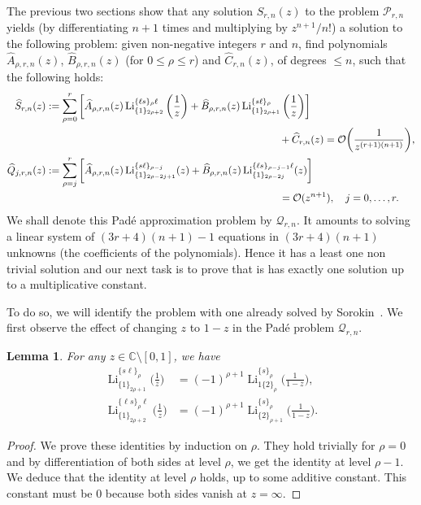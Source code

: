 \documentclass[reqno,12pt]{amsart}
\numberwithin{equation}{section}
\newtheorem{lem}{Lemma}
\theoremstyle{remark}
\def\li{\operatorname{Li}}
\begin{document}
The previous two sections show that any solution $S_{r,n}(z)$  to the problem $\mathcal{P}_{r,n}$ 
yields (by differentiating $n+1$ times and multiplying by $z^{n+1}/n!$) a solution to the following problem: given   
non-negative integers $r$ and $n$,  find polynomials $\widehat{A}_{\rho,r,n}(z)$, 
$ \widehat{B}_{\rho,r,n}(z)$ (for $0 \leq \rho \leq r$) and $ \widehat{C}_{r,n}(z) $, 
of degrees $\leq n$, such that the following holds:
\begin{align}
\widehat{S}_{r,n}(z)&
:= \sum_{\rho=0}^r \bigg[\widehat{A}_{\rho,r,n}(z) \li_{\{1\}_{2\rho+2}}^{\{\ell s\}_\rho \ell}\bigg(\frac1z\bigg) 
 +\widehat{B}_{\rho,r,n}(z) \li_{\{1\}_{2\rho+1}}^{\{s\ell\}_\rho}\bigg(\frac1z\bigg)  \bigg]  \notag
\\
&\hspace{8cm} + \widehat{C}_{r,n}(z) = \mathcal{O}\bigg(\frac{1}{z^{(r+1)(n+1)}}\bigg),  \notag
\\
\widehat{Q}_{j,r,n}(z)&:=\sum_{\rho=j}^r \bigg[\widehat{A}_{\rho,r,n}(z) 
\li_{\{1\}_{2\rho-2j+1}}^{\{s\ell\}_{\rho-j}}(z) + \widehat{B}_{\rho,r,n}(z) 
\li_{\{1\}_{2\rho-2j}}^{\{\ell s\}_{\rho-j-1}\ell}(z) \bigg] \notag
\\
&\hspace{8cm} = \mathcal{O}(z^{n+1}), \quad j=0, \ldots, r.  \notag%
\end{align}
We shall denote this Pad\'e approximation problem by  $\mathcal{Q}_{r,n}$. 
It amounts to solving a linear system of $(3r+4)(n+1)-1$ equations 
in $(3r+4)(n+1)$ unknowns (the coefficients of the polynomials). Hence it has a least one non trivial 
solution and our next task is to prove that is has exactly one solution up to a multiplicative constant.

To do so, we will identify the problem with one already solved by Sorokin~\cite{sorokin1}. 
We first observe the effect of changing $z$ to $1-z$ in the Pad\'e problem  $\mathcal{Q}_{r,n}$.

\begin{lem}\label{lem:6} For any $z\in \mathbb C\setminus [0,1]$, we have
\begin{align*}
\li_{\{1\}_{2\rho+1}}^{\{s\ell \}_\rho}\bigg(\frac1z\bigg)&
  = (-1) ^{\rho+1}\li_{1\{2\}_{\rho}}^{\{s\}_\rho}\bigg(\frac1{1-z}\bigg), 
\\
\li_{\{1\}_{2\rho+2}}^{\{\ell s\}_\rho \ell}\bigg(\frac1z\bigg)&
  = (-1) ^{\rho+1}\li_{\{2\}_{\rho+1}}^{\{s\}_\rho}\bigg(\frac1{1-z}\bigg).
\end{align*}
\end{lem}
\begin{proof} We prove these identities by induction on $\rho$. They 
hold trivially  for $\rho=0$ and by differentiation of both sides at level $\rho$, we get 
the identity at level $\rho-1$. We deduce that the identity at level $\rho$ 
holds, up to some additive constant. This constant must be $0$ because both sides vanish at $z=\infty$.
\end{proof}
\end{document}
